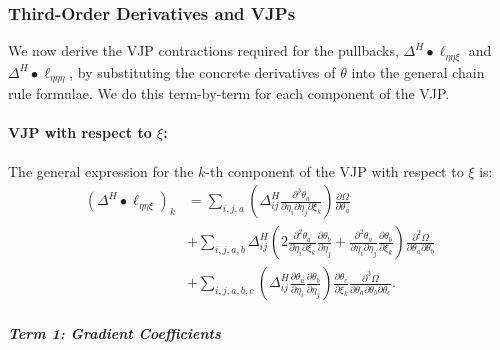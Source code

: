 \documentclass{article}
\begin{document}
\subsubsection{Third-Order Derivatives and VJPs}

We now derive the VJP contractions required for the pullbacks, $\Delta^H \bullet \ell_{\eta\eta\xi}$ and $\Delta^H \bullet \ell_{\eta\eta\eta}$, by substituting the concrete derivatives of $\theta$ into the general chain rule formulae.
We do this term-by-term for each component of the VJP.

\paragraph{VJP with respect to $\xi$:}

The general expression for the $k$-th component of the VJP with respect to $\xi$ is:
%
\begin{align}
  (\Delta^H \bullet \ell_{\eta\eta\xi})_k & = \sum_{i,j,a} \left( \Delta^H_{ij} \frac{\partial^3 \theta_a}{\partial \eta_i \partial \eta_j \partial \xi_k} \right) \frac{\partial \Omega}{\partial \theta_a} \nonumber                                                                                                                                                                         \\
                                          & + \sum_{i,j,a,b} \Delta^H_{ij} \left( 2 \frac{\partial^2 \theta_a}{\partial \eta_i \partial \xi_k} \frac{\partial \theta_b}{\partial \eta_j} + \frac{\partial^2 \theta_a}{\partial \eta_i \partial \eta_j} \frac{\partial \theta_b}{\partial \xi_k} \right) \frac{\partial^2 \Omega}{\partial \theta_a \partial \theta_b} \nonumber \\
                                          & + \sum_{i,j,a,b,c} \left( \Delta^H_{ij} \frac{\partial \theta_a}{\partial \eta_i} \frac{\partial \theta_b}{\partial \eta_j} \right) \frac{\partial \theta_c}{\partial \xi_k} \frac{\partial^3 \Omega}{\partial \theta_a \partial \theta_b \partial \theta_c}.
\end{align}

\subparagraph{Term 1: Gradient Coefficients}
\end{document}
